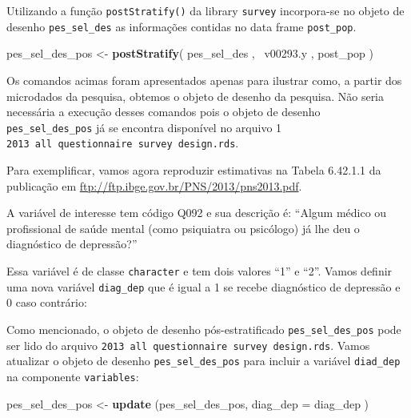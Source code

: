 \documentclass[]{book}
\newenvironment{Shaded}{\begin{snugshade}}{\end{snugshade}}
\newcommand{\KeywordTok}[1]{\textcolor[rgb]{0.13,0.29,0.53}{\textbf{{#1}}}}
\newcommand{\DataTypeTok}[1]{\textcolor[rgb]{0.13,0.29,0.53}{{#1}}}
\newcommand{\StringTok}[1]{\textcolor[rgb]{0.31,0.60,0.02}{{#1}}}
\newcommand{\NormalTok}[1]{{#1}}
\theoremstyle{definition}
\theoremstyle{definition}
\theoremstyle{remark}
\begin{document}
Utilizando a função \texttt{postStratify()} da library \texttt{survey}
\citep{R-survey} incorpora-se no objeto de desenho
\texttt{pes\_sel\_des} as informações contidas no data frame
\texttt{post\_pop}.

\begin{Shaded}
\begin{Highlighting}[]
\NormalTok{pes_sel_des_pos <-}\StringTok{ }\KeywordTok{postStratify}\NormalTok{( pes_sel_des , ~v00293.y , post_pop )}
\end{Highlighting}
\end{Shaded}

Os comandos acimas foram apresentados apenas para ilustrar como, a
partir dos microdados da pesquisa, obtemos o objeto de desenho da
pesquisa. Não seria necessária a execução desses comandos pois o objeto
de desenho \texttt{pes\_sel\_des\_pos} já se encontra disponível no
arquivo 1 \texttt{2013\ all\ questionnaire\ survey\ design.rds}.

Para exemplificar, vamos agora reproduzir estimativas na Tabela 6.42.1.1
da publicação em \url{ftp://ftp.ibge.gov.br/PNS/2013/pns2013.pdf}.

A variável de interesse tem código Q092 e sua descrição é: ``Algum
médico ou profissional de saúde mental (como psiquiatra ou psicólogo) já
lhe deu o diagnóstico de depressão?''

Essa variável é de classe \texttt{character} e tem dois valores ``1'' e
``2''. Vamos definir uma nova variável \texttt{diag\_dep} que é igual a
1 se recebe diagnóstico de depressão e 0 caso contrário:

\begin{Shaded}
\end{Shaded}

Como mencionado, o objeto de desenho pós-estratificado
\texttt{pes\_sel\_des\_pos} pode ser lido do arquivo
\texttt{2013\ all\ questionnaire\ survey\ design.rds}. Vamos atualizar o
objeto de desenho \texttt{pes\_sel\_des\_pos} para incluir a variável
\texttt{diad\_dep} na componente \texttt{variables}:

\begin{Shaded}
\begin{Highlighting}[]
\NormalTok{pes_sel_des_pos <-}\StringTok{ }\KeywordTok{update} \NormalTok{(pes_sel_des_pos, }\DataTypeTok{diag_dep =} \NormalTok{diag_dep )}
\end{Highlighting}
\end{Shaded}
\end{document}
